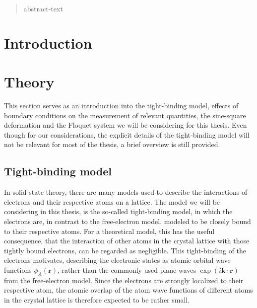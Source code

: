 \documentclass[11pt, a4paper]{article}
\theoremstyle{definition} %
\begin{document}
\begin{abstract}
    abstract-text
\end{abstract}

\newpage
\tableofcontents
\newpage


\section{Introduction}

\section{Theory}
This section serves as an introduction into the tight-binding model, effects of boundary conditions on the measurement of relevant quantities, the sine-square deformation and the Floquet system we will be considering for this thesis. Even though for our considerations, the explicit details of the tight-binding model will not be relevant for most of the thesis, a brief overview is still provided.

\subsection{Tight-binding model}
In solid-state theory, there are many models used to describe the interactions of electrons and their respective atoms on a lattice. The model we will be considering in this thesis, is the so-called tight-binding model, in which the electrons are, in contrast to the free-electron model, modeled to be closely bound to their respective atoms. For a theoretical model, this has the useful consequence, that the interaction of other atoms in the crystal lattice with those tightly bound electrons, can be regarded as negligible.  This tight-binding of the electrons motivates, describing the electronic states as atomic orbital wave functions $\phi_A(\mathbf{r})$, rather than the commonly used plane waves $\exp(i \mathbf{k} \cdot \mathbf{r})$ from the free-electron model. Since the electrons are strongly localized to their respective atom, the atomic overlap of the atom wave functions of different atoms in the crystal lattice is therefore expected to be rather small. \\
\end{document}
